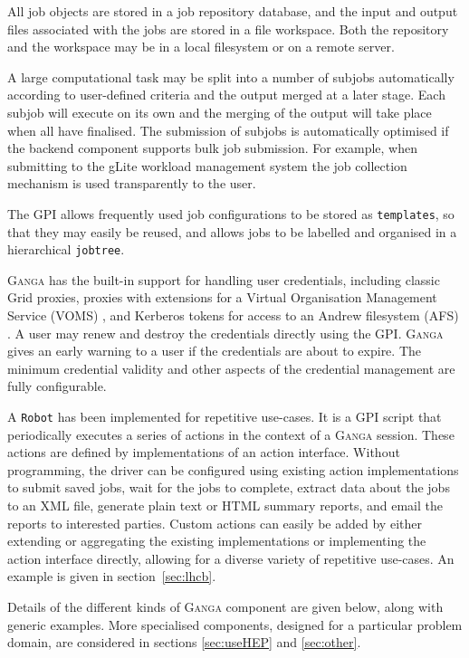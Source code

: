 \documentclass{elsart}
\def\ganga {\textsc{Ganga}\xspace}
\def\grid {Grid\xspace}
\def\GPI{GPI\xspace}
\newcommand{\code}[1]{\texttt{#1}}
\begin{document}
All job objects are stored in a job repository database, and the input
and output files associated with the jobs are stored in a file workspace. Both
the repository and the workspace may be in a local filesystem or on a remote
server.

A large computational task may be split into a number of subjobs
automatically according to user-defined criteria and the output merged
at a later stage. Each subjob will execute on its own and the merging
of the output will take place when all have finalised. The
submission of subjobs is automatically optimised if the backend
component supports bulk job submission. For example, when submitting to
the gLite workload management system \cite{andreetto_2008} the job collection
mechanism is used transparently to the user.

The \GPI allows frequently used job configurations to be
stored as \code{templates}, so that they may easily be reused, and allows
jobs to be labelled and organised in a hierarchical \code{jobtree}.

\ganga has the built-in support for handling user credentials, including
classic \grid proxies, proxies with extensions for a Virtual Organisation Management
Service (VOMS) \cite{VOMS}, and Kerberos \cite{kerberos} tokens
for access to an Andrew filesystem (AFS) \cite{AFS}. A user may renew and destroy the
credentials directly using the GPI. \ganga gives an early warning to a
user if the credentials are about to expire. The minimum credential
validity and other aspects of the credential management are fully
configurable.

A \code{Robot} has been implemented for repetitive use-cases. It is a \GPI
script that periodically executes a series of
actions in the context of a \ganga session.  These actions are defined by
implementations of an action interface.  Without programming, the driver can be
configured using existing action implementations to submit saved jobs, wait
for the jobs to complete, extract data about the jobs to an XML file, generate
plain text or HTML summary reports, and email the reports to interested
parties. Custom actions can easily be added by either extending or aggregating
the existing implementations or implementing the action interface directly,
allowing for a diverse variety of repetitive use-cases. An example is given
in section~\ref{sec:lhcb}.

Details of the different kinds of \ganga component are given below, along with
generic examples. More specialised components, designed for a particular
problem domain, are considered in sections \ref{sec:useHEP} and \ref{sec:other}.
\end{document}
